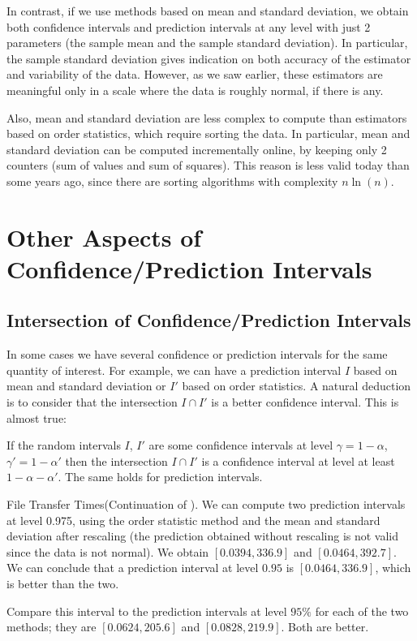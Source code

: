 In contrast, if we use methods based on mean and standard
deviation, we obtain both confidence intervals and prediction
intervals at any level with just 2 parameters (the sample mean
and the sample standard deviation). In particular, the sample
standard deviation gives indication on both accuracy of the
estimator and variability of the data. However, as we saw
earlier, these estimators are meaningful only in a scale where
the data is roughly normal, if there is any.

Also, mean and standard deviation are less
complex to compute than estimators based on order
statistics, which require sorting the data. In
particular, mean and standard deviation can be
computed incrementally online, by keeping only 2
counters (sum of values and sum of squares). This
reason is less valid today than some years ago,
since there are sorting algorithms with
complexity $ n \ln(n)$.

\section{Other Aspects of Confidence/Prediction Intervals}
\subsection{Intersection of Confidence/Prediction Intervals} In
some cases we have several confidence or prediction intervals
for the same quantity of interest. For example, we can have a
prediction interval $I$ based on mean and standard deviation or
$I'$ based on order statistics. A natural deduction is to
consider that the intersection $I \cap I'$ is a better
confidence interval. This is almost true:

\begin{shadethm}
If the random intervals $I$, $I'$ are some
confidence intervals at level $\gamma=1-\alpha$,
$\gamma'=1-\alpha'$ then the intersection $I \cap
I'$ is a confidence interval at level at least
$1-\alpha-\alpha'$. The same holds for prediction
intervals.\label{theo-inter-ci}
\end{shadethm}

\begin{ex}{File Transfer Times}(Continuation of
). We can compute two prediction intervals
at level 0.975, using the order statistic method and the mean
and standard deviation after rescaling (the prediction obtained
without rescaling is not valid since the data is not normal).
We obtain $[0.0394,336.9]$ and $[0.0464,392.7]$. We can
conclude that a prediction interval at level $0.95$ is
$[0.0464,  336.9]$, which is better than the two.

Compare this interval to the prediction intervals at level
$95\%$ for each of the two methods; they are $[0.0624, 205.6]$
and $[0.0828, 219.9]$. Both are better.
\end{ex}

